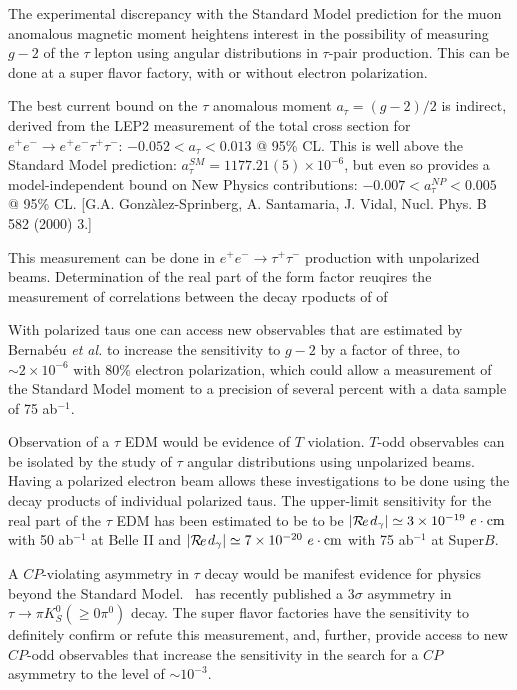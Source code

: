 The experimental discrepancy with the Standard Model prediction for
the muon anomalous magnetic moment heightens interest in the
possibility of measuring $g-2$ of the $\tau$ lepton using angular
distributions in $\tau$-pair production. This can be done at a super flavor factory, with or without electron polarization.  

The best current bound on the $\tau$ anomalous moment  $a_{\tau}=(g-2)/2$ is indirect, derived from the LEP2 measurement of the total cross section for $e^+e^- \rightarrow e^+e^- \tau^+\tau^-$: $-0.052 < a_\tau < 0.013$ @ 95\% CL. This is well above the Standard Model prediction: $a_\tau^{SM} = 1177.21(5) \times 10^{-6}$, but even so provides a model-independent bound on New Physics contributions:  $-0.007 < a_\tau^{NP} < 0.005$ @ 95\% CL.  [G.A. Gonz\`alez-Sprinberg, A. Santamaria, J. Vidal, Nucl. Phys. B 582 (2000) 3.]

This measurement can be done in $e^+ e^- \rightarrow \tau^+\tau^-$ production with unpolarized beams. Determination of the real part of the form factor reuqires the measurement of correlations between the decay rpoducts of of 

With polarized taus one can access new observables that are estimated by
Bernab\'eu {\it et al.}\cite{ref:b1} to increase the sensitivity to
$g-2$ by a factor of three, to $\sim2\times 10^{-6}$ with 80\%
electron polarization, which could allow a measurement of the Standard
Model moment to a precision of several percent with a data sample of
75 ab$^{-1}$.

Observation of a $\tau$ EDM would be evidence of $T$ violation.  $T$-odd observables can be isolated by the study of $\tau$ angular
distributions using unpolarized beams. Having a polarized electron
beam allows these investigations to be done using the decay products
of individual polarized taus.  The upper-limit sensitivity for the real part of the
$\tau$ EDM has been estimated to be to be $|\Re{d_\gamma}|\simeq 3\times 10^{-19} \ e \cdot {\rm cm}$
with 50 ab$^{-1 }$ at Belle II and $|\Re{d_\gamma}|\simeq 7\times 10^{-20} \ e \cdot {\rm cm}$
with 75 ab$^{-1 }$ at Super$B$\cite{ref:b2}.

A $C\!P$-violating asymmetry in $\tau$ decay would be manifest evidence
for physics beyond the Standard Model. \babar\ has recently published
a 3$\sigma$ asymmetry in $\tau\to\pi K_S^0(\ge 0\pi^0)$
decay\cite{ref:taucp}. The super flavor factories have the sensitivity to
definitely confirm or refute this measurement, and, further, provide
access to new $C\!P$-odd observables that increase the sensitivity in the
search for a $C\!P$ asymmetry to the level of $\sim 10^{-3}$.
